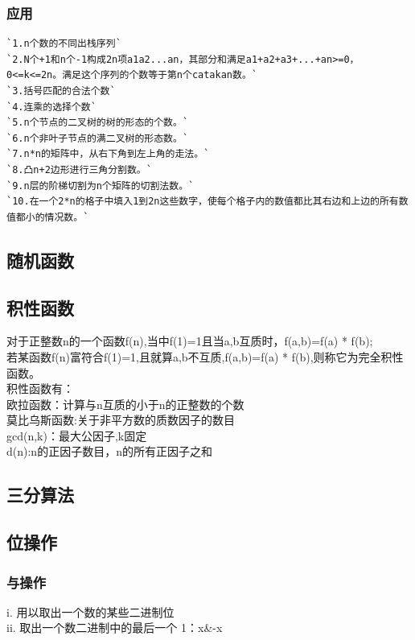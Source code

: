 \documentclass[a4paper]{article}
\begin{document}
\begin{CJK*}{UTF8}{gbsn}
\begin{multicols}{3}
\begin{flushleft}
\subsubsection{应用}
\begin{lstlisting}
`1.n个数的不同出栈序列`
`2.N个+1和n个-1构成2n项a1a2...an，其部分和满足a1+a2+a3+...+an>=0，0<=k<=2n。满足这个序列的个数等于第n个catakan数。`
`3.括号匹配的合法个数`
`4.连乘的选择个数`
`5.n个节点的二叉树的树的形态的个数。`
`6.n个非叶子节点的满二叉树的形态数。`
`7.n*n的矩阵中，从右下角到左上角的走法。`
`8.凸n+2边形进行三角分割数。`
`9.n层的阶梯切割为n个矩阵的切割法数。`
`10.在一个2*n的格子中填入1到2n这些数字，使每个格子内的数值都比其右边和上边的所有数值都小的情况数。`
\end{lstlisting}

\subsection{随机函数}


\subsection{积性函数}
对于正整数n的一个函数f(n),当中f(1)=1且当a,b互质时，f(a,b)=f(a) * f(b);\\
若某函数f(n)富符合f(1)=1,且就算a,b不互质,f(a,b)=f(a) * f(b),则称它为完全积性函数。\\

积性函数有：\\
欧拉函数：计算与n互质的小于n的正整数的个数\\
莫比乌斯函数:关于非平方数的质数因子的数目\\
gcd(n,k)：最大公因子,k固定\\
d(n):n的正因子数目，n的所有正因子之和\\

\subsection{三分算法}


\subsection{位操作}

\subsubsection{与操作}
i. 用以取出一个数的某些二进制位\\
ii. 取出一个数二进制中的最后一个 1：x\&-x


\end{flushleft}
\end{multicols}
\end{CJK*}
\end{document}
